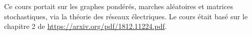 Ce cours portait sur les graphes pondérés, marches aléatoires et matrices stochastiques, via la théorie des réseaux électriques. Le cours était basé sur le chapitre 2 de \url{https://arxiv.org/pdf/1812.11224.pdf}.